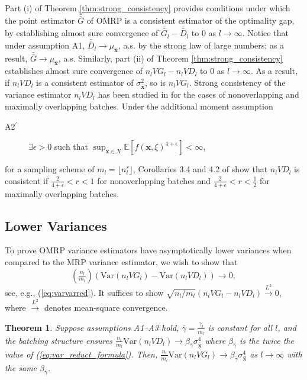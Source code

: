 \documentclass[12pt]{article}
\newtheorem{theorem}{Theorem}
\newcommand{\e}[1]{\mathbb{E} \left[ #1 \right]
}
\newcommand{\var}[1]{\mathrm{Var} \left( #1 \right)}
\newcommand{\x}{\mathbf{x}}
\newcommand{\xh}{{\hat{\x}}}
\newcommand{\gammab}{\bar{\gamma}}
\newcommand{\gb}{\bar{G}}
\newcommand{\gbb}{\bar{\gb}}
\newcommand{\db}{\bar{D}}
\newcommand{\dbb}{\bar{\db}}
\begin{document}
Part (i) of Theorem \ref{thm:strong_consistency} provides conditions under which the point estimator $\gbb$ of OMRP is a consistent estimator of the optimality gap, by establishing almost sure convergence of $\gbb_l - \dbb_l$ to $0$ as $l \rightarrow \infty$. 
Notice that under assumption A1, $\dbb_l \rightarrow \mu_\xh$, a.s. by the strong law of large numbers; as a result, $\gbb \rightarrow \mu_\xh$, a.s. 
Similarly, part (ii) of Theorem \ref{thm:strong_consistency} establishes almost sure convergence of $n_l VG_l - n_l VD_l$ to $0$ as $l \rightarrow \infty$. 
As a result, if $n_l VD_l$ is a consistent estimator of $\sigma^2_{\xh}$, so is $n_l VG_l$.  
Strong consistency of the variance estimator $n_l VD_l$ has been studied in \citep{damerdji1994strong} for the cases of nonoverlapping and maximally overlapping batches.  
Under the additional moment assumption
\begin{description}
	\item[A2$^\prime$]  $\exists \epsilon > 0$ such that $\sup_{\x \in X} \e{f(\x,\xi)^{4+\epsilon}} < \infty$,
\end{description}
for a sampling scheme of $m_l = \lfloor n_l^r \rfloor$, Corollaries 3.4 and 4.2 of \citep{damerdji1994strong} show that $n_l VD_l$ is consistent if $\tfrac{2}{4+\epsilon} < r < 1$ for nonoverlapping batches and $\tfrac{2}{4+\epsilon} < r < \tfrac{1}{2}$ for maximally overlapping batches. 


\subsection{Lower Variances}
\label{ssec:var_reduct}

 
To prove OMRP variance estimators have asymptotically lower variances when compared to the MRP variance estimator, we wish to show that 
$$
(\tfrac{n_l}{m_l}) \left( \var{n_l VG_l} - \var{n_l VD_l} \right) \rightarrow 0;
$$
see, e.g., (\ref{eq:varvarred}).
It suffices to show $\sqrt{{n_l}/{m_l}} \left( n_l VG_l - n_l VD_l \right) \xrightarrow{L^2} 0$, where $\xrightarrow{L^2}$ denotes mean-square convergence.


\begin{theorem} \label{thm:varvar_conv}
	Suppose assumptions A1--A3 hold, $\gammab = \frac{\gamma_l}{m_l}$ is constant for all $l$, and the batching structure ensures  $\frac{n_l}{m_l}\var{n_l VD_l} \rightarrow \beta_{\gammab} \sigma^4_{\xh}$ where $\beta_{\gammab}$ is the twice the value of (\ref{eq:var_reduct_formula}). 
        Then, $\frac{n_l}{m_l}\var{n_l VG_l} \rightarrow \beta_{\gammab} \sigma^4_{\xh}$ as $l \rightarrow \infty$ with the same $\beta_{\gammab}$. 
\end{theorem}
\end{document}
